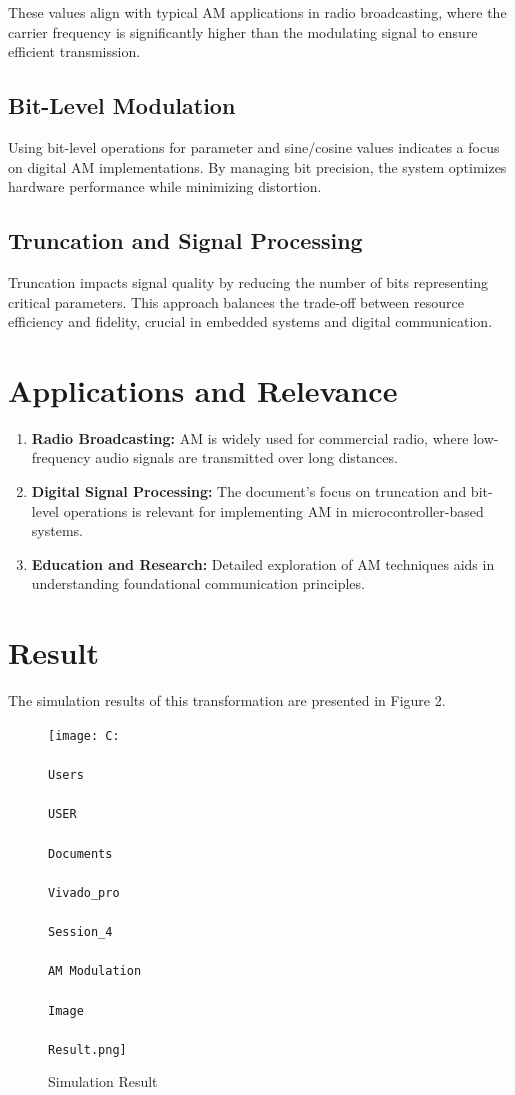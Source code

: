 \documentclass[paper=a4, fontsize=11pt, onecolumn]{scrartcl}	 %
\begin{document}
These values align with typical AM applications in radio broadcasting, where the carrier frequency is significantly higher than the modulating signal to ensure efficient transmission.

\subsection*{Bit-Level Modulation}
Using bit-level operations for parameter and sine/cosine values indicates a focus on digital AM implementations. By managing bit precision, the system optimizes hardware performance while 
minimizing distortion.

\subsection*{Truncation and Signal Processing}
Truncation impacts signal quality by reducing the number of bits representing critical parameters. This approach balances the trade-off between resource efficiency and fidelity, crucial 
in embedded systems and digital communication.

\section*{Applications and Relevance}
\begin{enumerate}
    \item \textbf{Radio Broadcasting:} AM is widely used for commercial radio, where low-frequency audio signals are transmitted over long distances.
    \item \textbf{Digital Signal Processing:} The document's focus on truncation and bit-level operations is relevant for implementing AM in microcontroller-based systems.
    \item \textbf{Education and Research:} Detailed exploration of AM techniques aids in understanding foundational communication principles.
\end{enumerate}

\section*{Result}
The simulation results of this transformation are presented in Figure 2.
\begin{figure}[ht]
    \centering
  \texttt{[image: C:\\\\Users\\\\USER\\\\Documents\\\\Vivado\_pro\\\\Session\_4\\\\AM Modulation\\\\Image\\\\Result.png]}
  \caption{Simulation Result}
  \label{fig:Result}
\end{figure}
\end{document}
